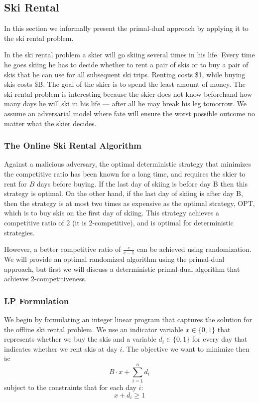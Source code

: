 \subsection{Ski Rental}

In this section we informally present the primal-dual approach by applying it to the ski rental problem.

In the ski rental problem a skier will go skiing several times in his life.
Every time he goes skiing he has to decide whether to rent a pair of skis or to buy a pair of skis that he can use for all subsequent ski trips.
Renting costs \$1, while buying skis costs \$B.
The goal of the skier is to spend the least amount of money.
The ski rental problem is interesting because the skier does not know beforehand how many days he will ski in his life --- after all he may break his leg tomorrow.
We assume an adversarial model where fate will ensure the worst possible outcome no matter what the skier decides.

\subsubsection{The Online Ski Rental Algorithm}
Against a malicious adversary, the optimal deterministic strategy that minimizes the competitive ratio has been known for a long time, and requires the skier to rent for $B$ days before buying.
If the last day of skiing is before day B then this strategy is optimal.
On the other hand, if the last day of skiing is after day B, then the strategy is at most two times as expensive as the optimal strategy, OPT, which is to buy skis on the first day of skiing.
This strategy achieves a competitive ratio of 2 (it is 2-competitive), and is optimal for deterministic strategies.

However, a better competitive ratio of $\frac{e}{e-1}$ can be achieved using randomization.
We will provide an optimal randomized algorithm using the primal-dual approach, but first we will discuss a deterministic primal-dual algorithm that achieves 2-competitiveness.

\subsubsection{LP Formulation}
We begin by formulating an integer linear program that captures the solution for the offline ski rental problem.
We use an indicator variable $x \in \{0,1\}$ that represents whether we buy the skis and a variable $d_i \in \{0,1\}$ for every day that indicates whether we rent skis at day $i$. 
The objective we want to minimize then is:
\[ B\cdot x + \sum^n_{i=1} d_i \]
subject to the constraints that for each day $i$:
\[ x + d_i \ge 1 \]

